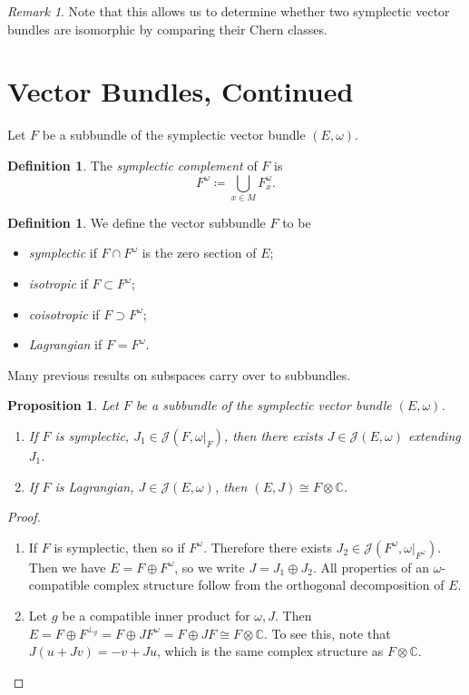 \documentclass[leqno, openany]{memoir}
\newtheorem{prop}[thm]{Proposition}
\theoremstyle{definition}
\newtheorem{defn}[thm]{Definition}
\theoremstyle{remark}
\newtheorem{rmk}[thm]{Remark}
\theoremstyle{plain}
\theoremstyle{definition}
\theoremstyle{remark}
\renewcommand{\C}{\mathbb{C}}
\newcommand{\mc}[1]{\mathcal{#1}}
\begin{document}
\begin{rmk}
    Note that this allows us to determine whether two symplectic vector bundles are isomorphic by comparing their Chern classes.
\end{rmk}

\section{Vector Bundles, Continued}%
\label{sec:vector_bundles_continued}

Let $F$ be a subbundle of the symplectic vector bundle $(E, \omega)$.

\begin{defn}
    The \textit{symplectic complement} of $F$ is
    \[ F^{\omega} \coloneqq \bigcup_{x \in M} F_x^{\omega}. \]
\end{defn}

\begin{defn}
    We define the vector subbundle $F$ to be
    \begin{itemize}
        \item \textit{symplectic} if $F \cap F^{\omega}$ is the zero section of $E$;
        \item \textit{isotropic} if $F \subset F^{\omega}$;
        \item \textit{coisotropic} if $F \supset F^{\omega}$;
        \item \textit{Lagrangian} if $F = F^{\omega}$.
    \end{itemize}
\end{defn}
Many previous results on subspaces carry over to subbundles.

\begin{prop}
    Let $F$ be a subbundle of the symplectic vector bundle $(E, \omega)$.
    \begin{enumerate}
        \item If $F$ is symplectic, $J_1 \in \mc{J}(F, \omega|_F)$, then there exists $J \in \mc{J}(E, \omega)$ extending $J_1$.
        \item If $F$ is Lagrangian, $J \in \mc{J}(E, \omega)$, then $(E, J) \cong F \otimes \C$.
    \end{enumerate}
\end{prop}

\begin{proof}
    \begin{enumerate}
        \item If $F$ is symplectic, then so if $F^{\omega}$. Therefore there exists $J_2 \in \mc{J}(F^{\omega}, \omega|_{F^{\omega}})$. Then we have $E = F \oplus F^{\omega}$, so we write $J = J_1 \oplus J_2$. All properties of an $\omega$-compatible complex structure follow from the orthogonal decomposition of $E$.
        \item Let $g$ be a compatible inner product for $\omega, J$. Then $E = F \oplus F^{\perp_g} = F \oplus JF^{\omega} = F \oplus JF \cong F \otimes \C$. To see this, note that $J(u + Jv) = -v + Ju$, which is the same complex structure as $F \otimes \C$. \qedhere
    \end{enumerate}
\end{proof}
\end{document}
